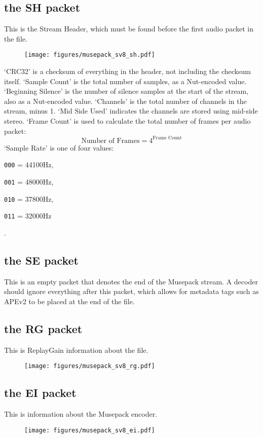 
\subsection{the SH packet}
This is the Stream Header, which must be found before the first
audio packet in the file.
\begin{figure}[h]
\texttt{[image: figures/musepack\_sv8\_sh.pdf]}
\end{figure}
\par
\noindent
`CRC32' is a checksum of everything in the header, not including the
checksum itself.
`Sample Count' is the total number of samples, as a Nut-encoded value.
`Beginning Silence' is the number of silence samples at the start
of the stream, also as a Nut-encoded value.
`Channels' is the total number of channels in the stream, minus 1.
`Mid Side Used' indicates the channels are stored using mid-side stereo.
`Frame Count' is used to calculate the total number of frames per
audio packet:
\begin{equation}
\text{Number of Frames} = 4 ^ \text{Frame Count}
\end{equation}
`Sample Rate' is one of four values:

\begin{inparaenum}
\item[\texttt{000} = ] 44100Hz,
\item[\texttt{001} = ] 48000Hz,
\item[\texttt{010} = ] 37800Hz,
\item[\texttt{011} = ] 32000Hz
\end{inparaenum}
.

\subsection{the SE packet}
This is an empty packet that denotes the end of the Musepack stream.
A decoder should ignore everything after this packet, which allows
for metadata tags such as APEv2 to be placed at the end of the file.

\subsection{the RG packet}
This is ReplayGain information about the file.
\begin{figure}[h]
\texttt{[image: figures/musepack\_sv8\_rg.pdf]}
\end{figure}

\subsection{the EI packet}
This is information about the Musepack encoder.
\begin{figure}[h]
\texttt{[image: figures/musepack\_sv8\_ei.pdf]}
\end{figure}
